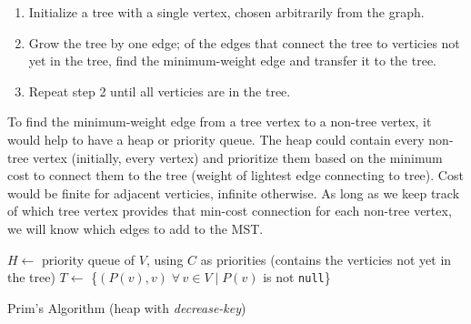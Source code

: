 \documentclass[12pt, titlepage]{article}
\begin{document}
\begin{enumerate}
  \item Initialize a tree with a single vertex, chosen arbitrarily from the graph.
  \item Grow the tree by one edge; of the edges that connect the tree to verticies not yet in the tree, find the minimum-weight edge and transfer it to the tree.
  \item Repeat step 2 until all verticies are in the tree.
\end{enumerate}

To find the minimum-weight edge from a tree vertex to a non-tree vertex, it would help to have a heap or priority queue. The heap could contain every non-tree vertex (initially, every vertex) and prioritize them based on the minimum cost to connect them to the tree (weight of lightest edge connecting to tree). Cost would be finite for adjacent verticies, infinite otherwise. As long as we keep track of which tree vertex provides that min-cost connection for each non-tree vertex, we will know which edges to add to the MST. \\

\begin{algorithm}[H]
  \SetAlgoLined
  \DontPrintSemicolon
  $H \longleftarrow$\hspace{0.5mm} priority queue of $V$, using $C$ as priorities\;
  \hspace{13mm}(contains the verticies not yet in the tree)\;
    $T \longleftarrow$\hspace{0.5mm} \{$(P(v), v)\;\forall\,v\in V\mid P(v)$ is not \texttt{null}\}\;
  \;
    \caption{Prim's Algorithm (heap with \textit{decrease-key})}
\end{algorithm} \medskip
\end{document}

